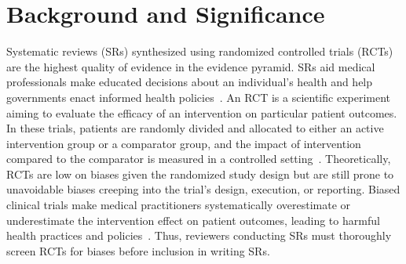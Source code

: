 \documentclass[sn-mathphys,Numbered]{sn-jnl}%
\theoremstyle{thmstyleone}%
\theoremstyle{thmstyletwo}%
\theoremstyle{thmstylethree}%
\begin{document}



\maketitle


\section{Background and Significance}
\label{sec:background}
%
Systematic reviews (SRs) synthesized using randomized controlled trials (RCTs) are the highest quality of evidence in the evidence pyramid.
SRs aid medical professionals make educated decisions about an individual's health and help governments enact informed health policies~\cite{mogo2022systematic,mctigue2006obesity}.
An RCT is a scientific experiment aiming to evaluate the efficacy of an intervention on particular patient outcomes.
In these trials, patients are randomly divided and allocated to either an active intervention group or a comparator group, and the impact of intervention compared to the comparator is measured in a controlled setting~\cite{sibbald1998understanding}.
Theoretically, RCTs are low on biases given the randomized study design but are still prone to unavoidable biases creeping into the trial's design, execution, or reporting.
Biased clinical trials make medical practitioners systematically overestimate or underestimate the intervention effect on patient outcomes, leading to harmful health practices and policies~\cite{kjaergard1999randomized,naci2019design}.
Thus, reviewers conducting SRs must thoroughly screen RCTs for biases before inclusion in writing SRs.
\end{document}
